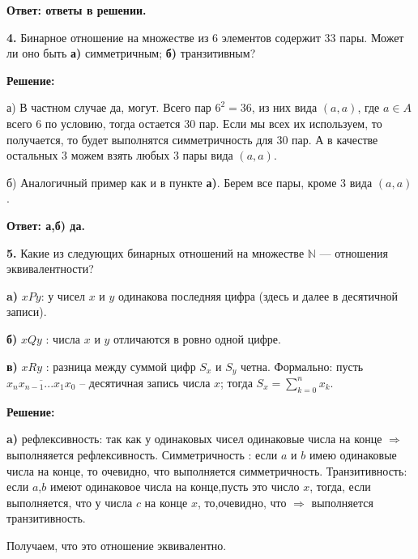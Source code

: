 \documentclass[a4paper,12pt]{article} %
\begin{document}
\begin{flushright}
\begin{large}
\textbf {Ответ: ответы в решении.}
\end{large}
\end{flushright}

{\bf 4.} Бинарное отношение на множестве из $6$ элементов содержит $33$ пары.
Может ли оно быть {\bf а)} симметричным; {\bf б)} транзитивным?
\begin{center}
\bfseries
{\Large Решение: }
\end{center}

а) В частном случае да, могут. Всего пар $6^2 = 36$, из них вида $(a,a)$, где $a \in A$ всего 6 по условию, тогда остается 30 пар. Если мы всех их используем, то получается, то будет выполнятся симметричность для 30 пар. А в качестве остальных 3 можем взять любых 3 пары вида $(a,a)$.

б) Аналогичный пример как и в пункте {\bf а)}. Берем все пары, кроме 3 вида $(a,a)$.

\begin{flushright}
\begin{large}
\textbf {Ответ: а,б) да.}
\end{large}
\end{flushright}

{\bf 5.} Какие из следующих бинарных отношений на множестве $\mathbb{N}$ — отношения эквивалентности?

{\bf a)} $xPy$: у чисел $x$ и $y$ одинакова последняя цифра (здесь и далее в десятичной записи).

{\bf б)} $xQy$ : числа $x$ и $y$ отличаются в ровно одной цифре.

{\bf в)} $xRy$ : разница между суммой цифр $S_x$ и $S_y$ четна. Формально: пусть $\overline{x_nx_{n-1}...x_1x_0}$ -- десятичная запись числа $x$; тогда $S_x = \sum\limits_{k = 0}^{n}x_k.$  
\begin{center}
\bfseries
{\Large Решение: }
\end{center}

{\bf a)} рефлексивность: так как у одинаковых чисел одинаковые числа на конце $\Rightarrow$ выполняяется рефлексивность. Симметричность : если $a$ и $b$ имею одинаковые числа на конце, то очевидно, что выполняется симметричность. Транзитивность: если $a$,$b$ имеют одинаковое числа на конце,пусть это число $x$, тогда, если выполняется, что у числа $c$ на конце $x$, то,очевидно, что  $\Rightarrow$ выполняется транзитивность.

Получаем, что это отношение эквивалентно.
\end{document}
